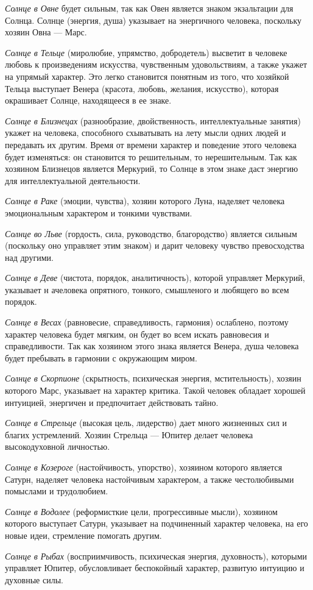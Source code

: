 \begin{myenum}
	\item \emph{Солнце в Овне} будет сильным, так как Овен является знаком экзальтации для Солнца. Солнце (энергия, душа) указывает на энергичного человека, поскольку хозяин Овна --- Марс.
	\item \emph{Солнце в Тельце} (миролюбие, упрямство, добродетель) высветит в человеке любовь к произведениям искусства, чувственным удовольствиям, а также укажет на упрямый характер. Это легко становится понятным из того, что хозяйкой Тельца выступает Венера (красота, любовь, желания, искусство), которая окрашивает Солнце, находящееся в ее знаке.
	\item \emph{Солнце в Близнецах} (разнообразие, двойственность, интеллектуальные занятия) укажет на человека, способного схыватывать на лету мысли одних людей и передавать их другим. Время от времени характер и поведение этого человека будет изменяться: он становится то решительным, то нерешительным. Так как хозяином Близнецов является Меркурий, то Солнце в этом знаке даст энергию для интеллектуальной деятельности.
	\item \emph{Солнце в Раке} (эмоции, чувства), хозяин которого Луна, наделяет человека эмоциональным характером и тонкими чувствами.
	\item \emph{Солнце во Льве} (гордость, сила, руководство, благородство) является сильным (поскольку оно управляет этим знаком) и дарит человеку чувство превосходства над другими.
	\item \emph{Солнце в Деве} (чистота, порядок, аналитичность), которой управляет Меркурий, указывает н ачеловека опрятного, тонкого, смышленого и любящего во всем порядок.
	\item \emph{Солнце в Весах} (равновесие, справедливость, гармония) ослаблено, поэтому характер человека будет мягким, он будет во всем искать равновесия и справедливости. Так как хозяином этого знака является Венера, душа человека будет пребывать в гармонии с окружающим миром.
	\item \emph{Солнце в Скорпионе} (скрытность, психическая энергия, мстительность), хозяин которого Марс, указывает на характер критика. Такой человек обладает хорошей интуицией, энергичен и предпочитает действовать тайно.
	\item \emph{Солнце в Стрельце} (высокая цель, лидерство) дает много жизненных сил и благих устремлений. Хозяин Стрельца --- Юпитер делает человека высокодуховной личностью.
	\item \emph{Солнце в Козероге} (настойчивость, упорство), хозяином которого является Сатурн, наделяет человека настойчивым характером, а также честолюбивыми помыслами и трудолюбием.
	\item \emph{Солнце в Водолее} (реформисткие цели, прогрессивные мысли), хозяином которого выступает Сатурн, указывает на подчиненный характер человека, на его новые идеи, стремление помогать другим.
	\item \emph{Солнце в Рыбах} (восприимчивость, психическая энергия, духовность), которыми управляет Юпитер, обусловливает беспокойный характер, развитую интуицию и духовные силы.
\end{myenum}

